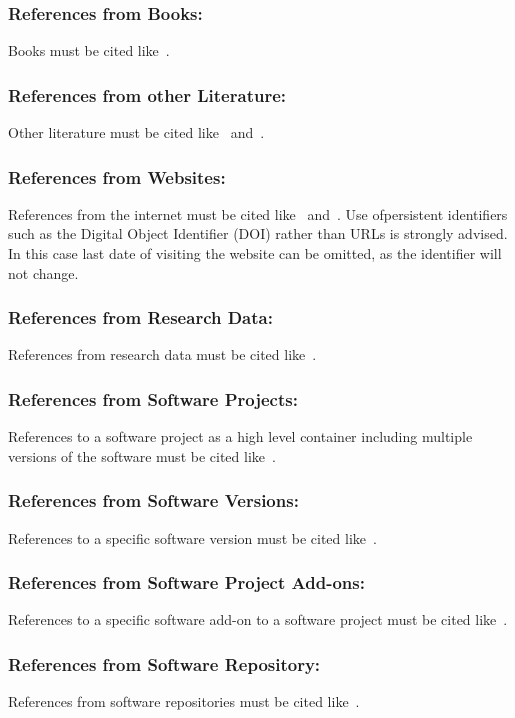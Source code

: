 \documentclass{isprs} %
\begin{document}
\subsubsection{References from Books:}
Books must be cited like~\cite{foerstner2016}.

\subsubsection{References from other Literature:}
Other literature must be cited like~\cite{smith1987rep} and~\cite{smith2000}.

\subsubsection{References from Websites:}
References from the internet must be cited like~\cite{chan2017} and~\cite{maas2017}. Use ofpersistent identifiers such as the Digital Object Identifier (DOI) rather than URLs is strongly advised. In this case last date of visiting the website can be omitted, as the identifier will not change.

\subsubsection{References from Research Data:}
References from research data must be cited like~\cite{dubayah2013}.

\subsubsection{References from Software Projects:}
References to a software project as a high level container including multiple versions of the software must be cited like~\cite{grass2017}.

\subsubsection{References from Software Versions:}
References to a specific software version must be cited like~\cite{grass2015}.

\subsubsection{References from Software Project Add-ons:}
References to a specific software add-on to a software project must be cited like~\cite{lennert2017}.

\subsubsection{References from Software Repository:}
References from software repositories must be cited like~\cite{gago2016}.

{
	\begin{spacing}{1.17}
		\normalsize
	\end{spacing}
}
\end{document}
